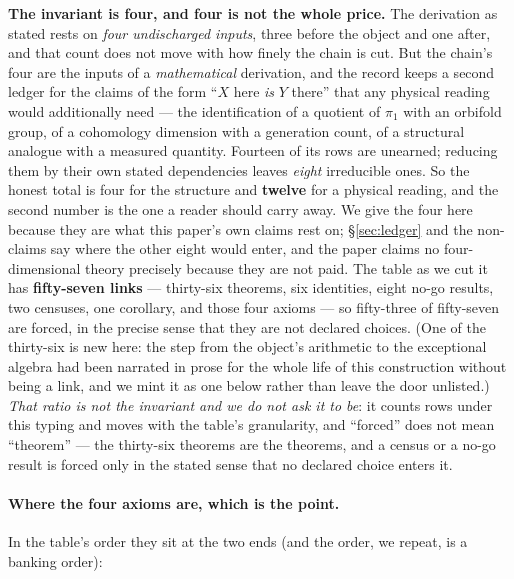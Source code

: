 \documentclass[11pt,a4paper]{article}
\theoremstyle{definition}
\theoremstyle{remark}
\begin{document}
\textbf{The invariant is four, and four is not the whole price.} The derivation as stated rests on \emph{four
undischarged inputs}, three before the object and one after, and that count does not move with how finely the chain is
cut. But the chain's four are the inputs of a \emph{mathematical} derivation, and the record keeps a second ledger for
the claims of the form ``$X$ here \emph{is} $Y$ there'' that any physical reading would additionally need --- the
identification of a quotient of $\pi_1$ with an orbifold group, of a cohomology dimension with a generation count, of a
structural analogue with a measured quantity. Fourteen of its rows are unearned; reducing them by their own stated
dependencies leaves \emph{eight} irreducible ones. So the honest total is four for the structure and \textbf{twelve} for
a physical reading, and the second number is the one a reader should carry away. We give the four here because they are
what this paper's own claims rest on; \S\ref{sec:ledger} and the non-claims say where the other eight would enter, and
the paper claims no four-dimensional theory precisely because they are not paid. The table as we cut it has \textbf{fifty-seven
links} --- thirty-six theorems, six identities, eight no-go results, two censuses, one corollary, and those four axioms ---
so fifty-three of fifty-seven are forced, in the precise sense that they are not declared choices. (One of the thirty-six
is new here: the step from the object's arithmetic to the exceptional algebra had been narrated in prose for the whole life
of this construction without being a link, and we mint it as one below rather than leave the door unlisted.) \emph{That ratio is not
the invariant and we do not ask it to be}: it counts rows under this typing and moves with the table's granularity, and
``forced'' does not mean ``theorem'' --- the thirty-six theorems are the theorems, and a census or a no-go result is
forced only in the stated sense that no declared choice enters it.

\paragraph{Where the four axioms are, which is the point.} In the table's order they sit at the two ends (and the
order, we repeat, is a banking order):
\end{document}
